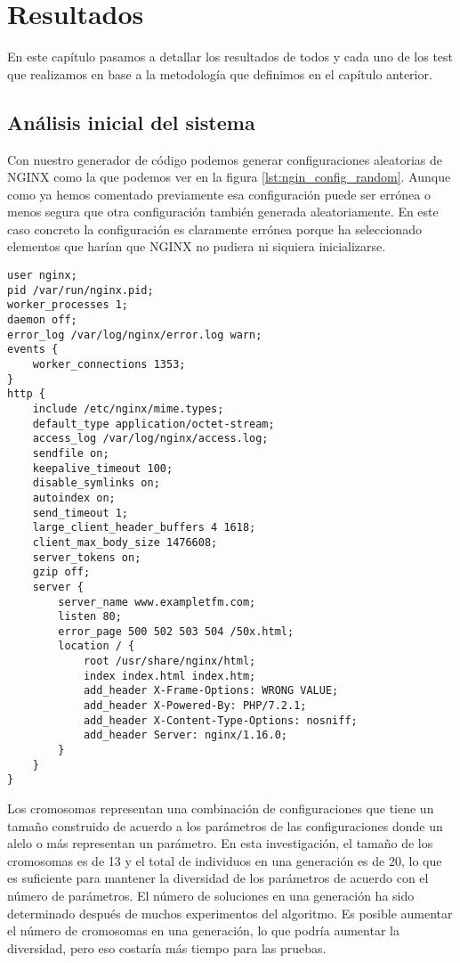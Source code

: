 \chapter{Resultados}

En este capítulo pasamos a detallar los resultados de todos y cada uno de los test que realizamos en base a la metodología que definimos en el capítulo anterior.

\section{Análisis inicial del sistema}

Con nuestro generador de código podemos generar configuraciones aleatorias de NGINX como la que podemos ver en la figura \ref{lst:ngin_config_random}. Aunque como ya hemos comentado previamente esa configuración puede ser errónea o menos segura que otra configuración también generada aleatoriamente. En este caso concreto la configuración es claramente errónea porque ha seleccionado elementos que harían que NGINX no pudiera ni siquiera inicializarse.

\begin{lstlisting}[label={lst:nginx_config_random},caption={Ejemplo de configuración aleatoria de NGINX}]
user nginx;
pid /var/run/nginx.pid;
worker_processes 1;
daemon off;
error_log /var/log/nginx/error.log warn;
events {
    worker_connections 1353;
}
http {
    include /etc/nginx/mime.types;
    default_type application/octet-stream;
    access_log /var/log/nginx/access.log;
    sendfile on;
    keepalive_timeout 100;
    disable_symlinks on;
    autoindex on;
    send_timeout 1;
    large_client_header_buffers 4 1618;
    client_max_body_size 1476608;
    server_tokens on;
    gzip off;
    server {
        server_name www.exampletfm.com;
        listen 80;
        error_page 500 502 503 504 /50x.html;
        location / {
            root /usr/share/nginx/html;
            index index.html index.htm;
            add_header X-Frame-Options: WRONG VALUE;
            add_header X-Powered-By: PHP/7.2.1;
            add_header X-Content-Type-Options: nosniff;
            add_header Server: nginx/1.16.0;
        }
    }
}
\end{lstlisting}

Los cromosomas representan una combinación de configuraciones que tiene un tamaño construido de acuerdo a los parámetros de las configuraciones donde un alelo o más representan un parámetro. En esta investigación, el tamaño de los cromosomas es de 13 y el total de individuos en una generación es de 20, lo que es suficiente para mantener la diversidad de los parámetros de acuerdo con el número de parámetros. El número de soluciones en una generación ha sido determinado después de muchos experimentos del algoritmo. Es posible aumentar el número de cromosomas en una generación, lo que podría aumentar la diversidad, pero eso costaría más tiempo para las pruebas.

